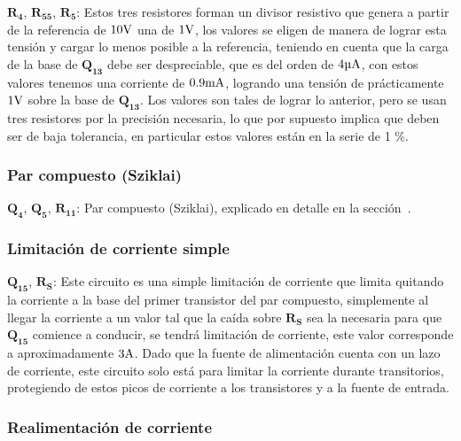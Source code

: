 $\bm{R_{4}}$, $\bm{R_{55}}$, $\bm{R_{5}}$: Estos tres resistores forman un divisor resistivo que genera a partir de la referencia de $10 \si[per-mode=symbol]{\volt}$  una de $1 \si[per-mode=symbol]{\volt}$, los valores se eligen de manera de lograr esta tensión y cargar lo menos posible a la referencia, teniendo en cuenta que la carga de la base de $\bm{Q_{13}}$ debe ser despreciable, que es del orden de $4 \si[per-mode=symbol]{\micro\ampere}$, con estos valores tenemos una corriente de $0.9 \si[per-mode=symbol]{\milli\ampere}$, logrando una tensión de prácticamente $1 \si[per-mode=symbol]{\volt}$ sobre la base de $\bm{Q_{13}}$. Los valores son tales de lograr lo anterior, pero se usan tres resistores por la precisión necesaria, lo que por supuesto implica que deben ser de baja tolerancia, en particular estos valores están en la serie de 1 \%.\\



\subsubsection{Par compuesto (Sziklai)}

$\bm{Q_{4}}$, $\bm{Q_{5}}$, $\bm{R_{11}}$: Par compuesto (Sziklai), explicado en detalle en la sección~.\\


\subsubsection{Limitación de corriente simple}

$\bm{Q_{15}}$, $\bm{R_{S}}$: Este circuito es una simple limitación de corriente que limita quitando la corriente a la base del primer transistor del par compuesto, simplemente al llegar la corriente a un valor tal que la caída sobre $\bm{R_{S}}$ sea la necesaria para que $\bm{Q_{15}}$ comience a conducir, se tendrá limitación de corriente, este valor corresponde a aproximadamente $3 \si[per-mode=symbol]{\ampere}$. Dado que la fuente de alimentación cuenta con un lazo de corriente, este circuito solo está para limitar la corriente durante transitorios, protegiendo de estos picos de corriente a los transistores y a la fuente de entrada.\\

\subsubsection{Realimentación de corriente}

